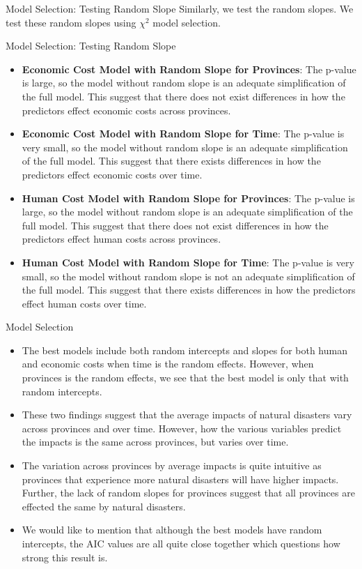 \begin{frame}{Model Selection: Testing Random Slope}
Similarly, we test the random slopes. We test these random slopes using $\chi^2$ model selection.
	
    
    
\end{frame}
\begin{frame}{Model Selection: Testing Random Slope}
\begin{itemize}
	\item \textbf{Economic Cost Model with Random Slope for Provinces}: The p-value is large, so the model without random slope is an adequate simplification of the full model. 
	This suggest that there does not exist differences in how the predictors effect economic costs across provinces.
	\item \textbf{Economic Cost Model with Random Slope for Time}: The p-value is very small, so the model without random slope is an adequate simplification of the full model. 
	This suggest that there exists differences in how the predictors effect economic costs over time.
	\item \textbf{Human Cost Model with Random Slope for Provinces}: The p-value is large, so the model without random slope is an adequate simplification of the full model. 
	This suggest that there does not exist differences in how the predictors effect human costs across provinces.
	\item \textbf{Human Cost Model with Random Slope for Time}: The p-value is very small, so the model without random slope is not an adequate simplification of the full model. This suggest that there exists differences in how the predictors effect human costs over time.
\end{itemize}
\end{frame}

\begin{frame}{Model Selection}
	\begin{itemize}
\item The best models include both random intercepts and slopes for both human and economic costs when time is the random effects. However, when provinces is the random effects, we see that the best model is only that with random intercepts. 
\item These two findings suggest that the average impacts of natural disasters vary across provinces and over time. However, how the various variables predict the impacts is the same across provinces, but varies over time.
\item The variation across provinces by average impacts is quite intuitive as provinces that experience more natural disasters will have higher impacts. Further, the lack of random slopes for provinces suggest that all provinces are effected the same by natural disasters.
	\item We would like to mention that although the best models have random intercepts, the AIC values are all quite close together which questions how strong this result is.
	\end{itemize}
\end{frame}

